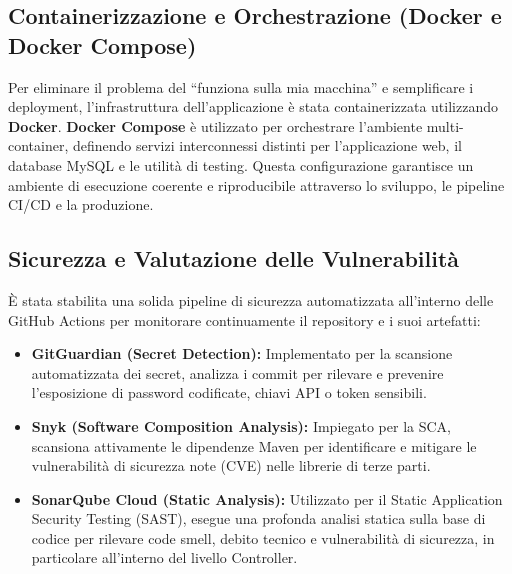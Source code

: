 \subsection{Containerizzazione e Orchestrazione (Docker e Docker Compose)}
Per eliminare il problema del ``funziona sulla mia macchina'' e semplificare i deployment, l'infrastruttura dell'applicazione è stata containerizzata utilizzando \textbf{Docker}. \textbf{Docker Compose} è utilizzato per orchestrare l'ambiente multi-container, definendo servizi interconnessi distinti per l'applicazione web, il database MySQL e le utilità di testing. Questa configurazione garantisce un ambiente di esecuzione coerente e riproducibile attraverso lo sviluppo, le pipeline CI/CD e la produzione.

\subsection{Sicurezza e Valutazione delle Vulnerabilità}
È stata stabilita una solida pipeline di sicurezza automatizzata all'interno delle GitHub Actions per monitorare continuamente il repository e i suoi artefatti:
\begin{itemize}
    \item \textbf{GitGuardian (Secret Detection):} Implementato per la scansione automatizzata dei secret, analizza i commit per rilevare e prevenire l'esposizione di password codificate, chiavi API o token sensibili.
    \item \textbf{Snyk (Software Composition Analysis):} Impiegato per la SCA, scansiona attivamente le dipendenze Maven per identificare e mitigare le vulnerabilità di sicurezza note (CVE) nelle librerie di terze parti.
    \item \textbf{SonarQube Cloud (Static Analysis):} Utilizzato per il Static Application Security Testing (SAST), esegue una profonda analisi statica sulla base di codice per rilevare code smell, debito tecnico e vulnerabilità di sicurezza, in particolare all'interno del livello Controller.
\end{itemize}